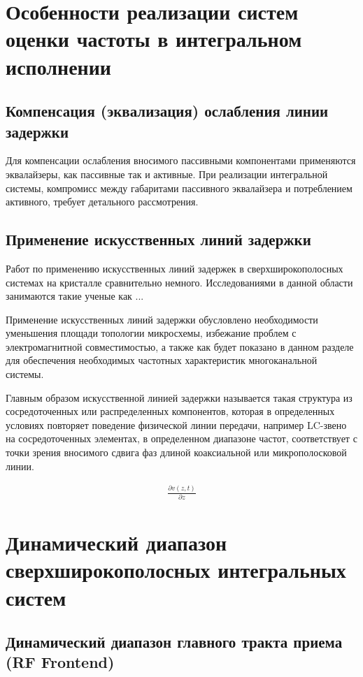 \section{Особенности реализации систем оценки частоты в интегральном исполнении}

\subsection{Компенсация (эквализация) ослабления линии задержки}
Для компенсации ослабления вносимого пассивными компонентами применяются эквалайзеры, как пассивные так и активные. При реализации интегральной системы, компромисс между габаритами пассивного эквалайзера и потреблением активного, требует детального рассмотрения.

\subsection{Применение искусственных линий задержки}
Работ по применению искусственных линий задержек в сверхширокополосных системах на кристалле сравнительно немного. Исследованиями в данной области занимаются такие ученые как ...

Применение искусственных линий задержки обусловлено необходимости уменьшения площади топологии микросхемы, избежание проблем с электромагнитной совместимостью, а также как будет показано в данном разделе для обеспечения необходимых частотных характеристик многоканальной системы.

Главным образом искусственной линией задержки называется такая структура из сосредоточенных или распределенных компонентов, которая в определенных условиях повторяет поведение физической линии передачи, например LC-звено на сосредоточенных элементах, в определенном диапазоне частот, соответствует с точки зрения вносимого сдвига фаз длиной коаксиальной или микрополосковой линии.

\begin{equation*}
	\begin{aligned}
		\frac{\partial v(z,t)}{\partial z}
	\end{aligned}
\end{equation*}

\section{Динамический диапазон сверхширокополосных интегральных систем}

\subsection{Динамический диапазон главного тракта приема (RF Frontend)}


